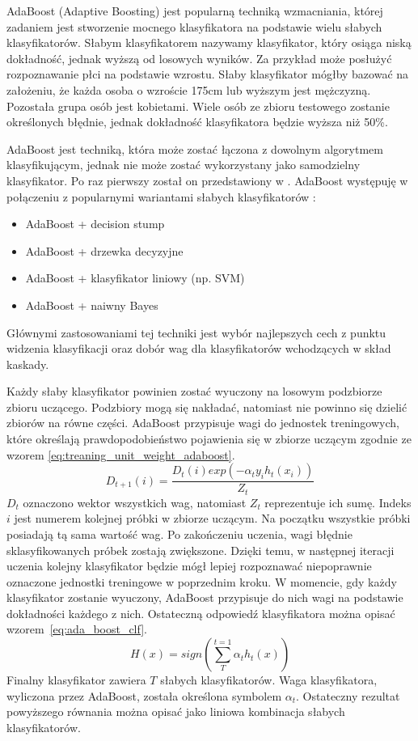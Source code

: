 AdaBoost (Adaptive Boosting) jest popularną techniką wzmacniania, której zadaniem jest stworzenie mocnego klasyfikatora na podstawie wielu słabych klasyfikatorów.
Słabym klasyfikatorem nazywamy klasyfikator, który osiąga niską dokładność, jednak wyższą od losowych wyników.
Za przykład może posłużyć rozpoznawanie płci na podstawie wzrostu.
Słaby klasyfikator mógłby bazować na założeniu, że każda osoba o wzroście 175cm lub wyższym jest mężczyzną.
Pozostała grupa osób jest kobietami.
Wiele osób ze zbioru testowego zostanie określonych błędnie, jednak dokładność klasyfikatora będzie wyższa niż 50\%.

AdaBoost jest techniką, która może zostać łączona z dowolnym algorytmem klasyfikującym, jednak nie może zostać wykorzystany jako samodzielny klasyfikator.
Po raz pierwszy został on przedstawiony w \cite{Freund1996ExperimentsWA}.
AdaBoost występuję w połączeniu z popularnymi wariantami słabych klasyfikatorów \cite{szybka_detekcja_klesk}:
\begin{itemize}
    \item AdaBoost + decision stump
    \item AdaBoost + drzewka decyzyjne
    \item AdaBoost + klasyfikator liniowy (np. SVM)
    \item AdaBoost + naiwny Bayes
\end{itemize}
Głównymi zastosowaniami tej techniki jest wybór najlepszych cech z punktu widzenia klasyfikacji oraz dobór wag dla klasyfikatorów wchodzących w skład kaskady.

Każdy słaby klasyfikator powinien zostać wyuczony na losowym podzbiorze zbioru uczącego.
Podzbiory mogą się nakładać, natomiast nie powinno się dzielić zbiorów na równe części.
AdaBoost przypisuje wagi do jednostek treningowych, które określają prawdopodobieństwo pojawienia się w zbiorze uczącym zgodnie ze wzorem \eqref{eq:treaning_unit_weight_adaboost}.
\begin{equation}
    \label{eq:treaning_unit_weight_adaboost}
    D_{t+1}(i) = \dfrac{D_t(i)exp(-\alpha_t y_i h_t(x_i))}{Z_t}
\end{equation}
$D_t$ oznaczono wektor wszystkich wag, natomiast $Z_t$ reprezentuje ich sumę.
Indeks $i$ jest numerem kolejnej próbki w zbiorze uczącym.
Na początku wszystkie próbki posiadają tą sama wartość wag.
Po zakończeniu uczenia, wagi błędnie sklasyfikowanych próbek zostają zwiększone.
Dzięki temu, w następnej iteracji uczenia kolejny klasyfikator będzie mógł lepiej rozpoznawać niepoprawnie oznaczone jednostki treningowe w poprzednim kroku.
W momencie, gdy każdy klasyfikator zostanie wyuczony, AdaBoost przypisuje do nich wagi na podstawie dokładności każdego z nich.
Ostateczną odpowiedź klasyfikatora można opisać wzorem~\eqref{eq:ada_boost_clf}.
\begin{equation}
    \label{eq:ada_boost_clf}
    H(x) = sign(\sum_{T}^{t=1} \alpha_t h_t(x))
\end{equation}
Finalny klasyfikator zawiera $T$ słabych klasyfikatorów.
Waga klasyfikatora, wyliczona przez AdaBoost, została określona symbolem $\alpha_t$.
Ostateczny rezultat powyższego równania można opisać jako liniowa kombinacja słabych klasyfikatorów.

